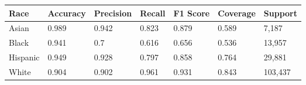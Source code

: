 \begin{tabular}{lllllll}
\toprule
Race & Accuracy & Precision & Recall & F1 Score & Coverage & Support \\
\midrule
Asian & 0.989 & 0.942 & 0.823 & 0.879 & 0.589 & 7,187 \\
Black & 0.941 & 0.7 & 0.616 & 0.656 & 0.536 & 13,957 \\
Hispanic & 0.949 & 0.928 & 0.797 & 0.858 & 0.764 & 29,881 \\
White & 0.904 & 0.902 & 0.961 & 0.931 & 0.843 & 103,437 \\
\bottomrule
\end{tabular}
